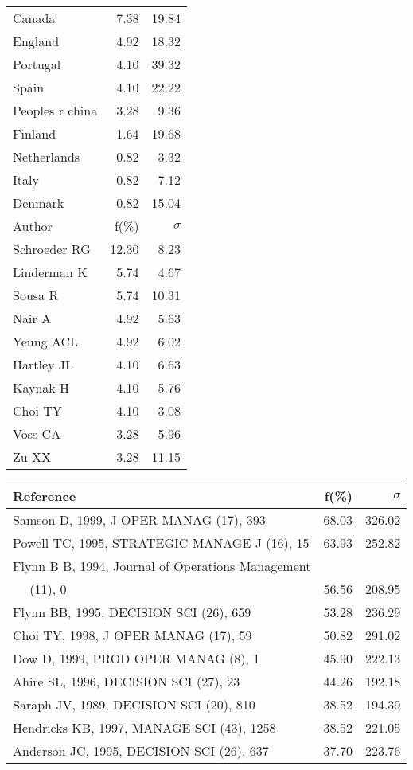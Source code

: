 \documentclass[a4paper,11pt]{report}
\begin{document}
\begin{landscape}
\begin{table}[!ht]
{\begin{tabular}{|l r r|}
Canada & 7.38 & 19.84\\
England & 4.92 & 18.32\\
Portugal & 4.10 & 39.32\\
Spain & 4.10 & 22.22\\
Peoples r china & 3.28 & 9.36\\
Finland & 1.64 & 19.68\\
Netherlands & 0.82 & 3.32\\
Italy & 0.82 & 7.12\\
Denmark & 0.82 & 15.04\\
\hline
\hline
Author & f(\%) & $\sigma$\\
\hline
Schroeder RG & 12.30 & 8.23\\
Linderman K & 5.74 & 4.67\\
Sousa R & 5.74 & 10.31\\
Nair A & 4.92 & 5.63\\
Yeung ACL & 4.92 & 6.02\\
Hartley JL & 4.10 & 6.63\\
Kaynak H & 4.10 & 5.76\\
Choi TY & 4.10 & 3.08\\
Voss CA & 3.28 & 5.96\\
Zu XX & 3.28 & 11.15\\
\hline
\end{tabular}
}
{\scriptsize\begin{tabular}{|l r r|}
\hline
Reference & f(\%) & $\sigma$\\
\hline
Samson D, 1999, J OPER MANAG (17), 393 & 68.03 & 326.02\\
Powell TC, 1995, STRATEGIC MANAGE J (16), 15 & 63.93 & 252.82\\
Flynn B B, 1994, Journal of Operations Management &  & \\
$\quad$ (11), 0 & 56.56 & 208.95\\
Flynn BB, 1995, DECISION SCI (26), 659 & 53.28 & 236.29\\
Choi TY, 1998, J OPER MANAG (17), 59 & 50.82 & 291.02\\
Dow D, 1999, PROD OPER MANAG (8), 1 & 45.90 & 222.13\\
Ahire SL, 1996, DECISION SCI (27), 23 & 44.26 & 192.18\\
Saraph JV, 1989, DECISION SCI (20), 810 & 38.52 & 194.39\\
Hendricks KB, 1997, MANAGE SCI (43), 1258 & 38.52 & 221.05\\
Anderson JC, 1995, DECISION SCI (26), 637 & 37.70 & 223.76\\

\end{tabular}}
\end{table}
\end{landscape}
\end{document}
